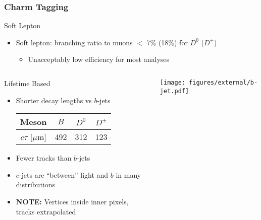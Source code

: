 \documentclass[usenames,dvipsnames]{beamer}
\begin{document}
\begin{frame}
  \frametitle{Charm Tagging}
  \begin{block}{Soft Lepton}
  \begin{itemize}
  \item Soft lepton: branching ratio to muons $<$ 7\% (18\%) for $D^0$ ($D^\pm$)
    \begin{itemize}
    \item Unacceptably low efficiency for most analyses
    \end{itemize}
  \end{itemize}
  \end{block}
  \begin{columns}
    \begin{column}{0.5\textwidth}
      \begin{block}{Lifetime Based}
      \begin{itemize}
      \item Shorter decay lengths vs $b$-jets
        \begin{center}
          \begin{tabular}{c | c c c}
            Meson  &  $B$ & $D^0$ & $D^{\pm}$ \\ \hline
            $c\tau$ [$\mu$m] & 492 & 312 & 123 \\
          \end{tabular}
        \end{center}
      \item Fewer tracks than $b$-jets
      \item $c$-jets are ``between'' light and $b$ in many distributions
      \item \textbf{NOTE:} Vertices inside inner pixels, tracks extrapolated
      \end{itemize}
      \end{block}
    \end{column}
    \begin{column}{0.5\textwidth}
      \texttt{[image: figures/external/b-jet.pdf]}
    \end{column}
  \end{columns}
\end{frame}
\end{document}
